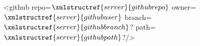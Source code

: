 <github repo=$\xmlstructref{server}{githubrepo}$ owner=$\xmlstructref{server}{githubuser}$ branch=$\xmlstructref{server}{githubbranch}$? path=$\xmlstructref{server}{githubpath}$?/>
